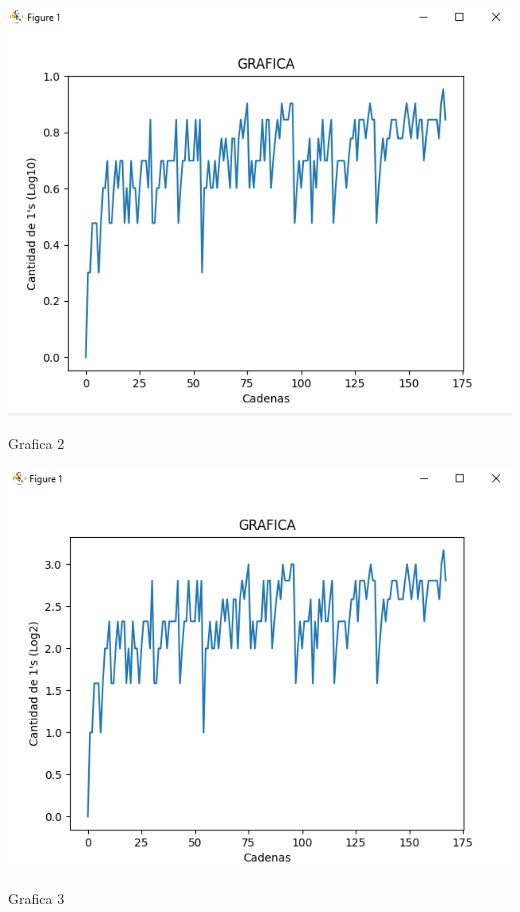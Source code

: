 \documentclass{article}
\begin{document}
\begin{center}
    \includegraphics[scale = 0.7]{Graphic2.png}
    \caption{Grafica 2}
\end{center}

\begin{center}
    \includegraphics[scale = 0.7]{Graphic3.png}
    \caption{Grafica 3}
\end{center}
\end{document}
